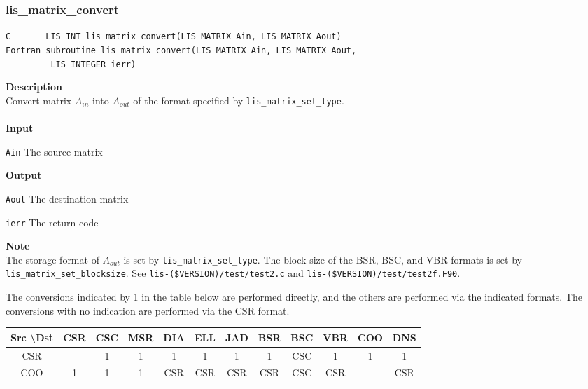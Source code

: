\documentclass[a4paper]{article}
\newcommand{\namelistlabel}[1]{\mbox{#1}\hfill}
\newenvironment{namelist}[1]{%
\begin{list}{}
  {\let\makelabel\namelistlabel
  \settowidth{\labelwidth}{#1}
  \setlength{\leftmargin}{1.1\labelwidth}}
  }{%
\end{list}}
\begin{document}
\newpage
\subsubsection{lis\_matrix\_convert}
\begin{screen}
\verb|C       LIS_INT lis_matrix_convert(LIS_MATRIX Ain, LIS_MATRIX Aout)|\\
\verb|Fortran subroutine lis_matrix_convert(LIS_MATRIX Ain, LIS_MATRIX Aout,|\\
\verb|         LIS_INTEGER ierr)|
\end{screen}
{\bf Description}\\
\indent
Convert matrix $A_{in}$ into $A_{out}$ of the format specified by {\tt lis\_matrix\_set\_type}.
\\ \\
\noindent
{\bf Input}
\begin{namelist}{XXXXXXXXXXXXXXXXXXXX}
\item[\tt Ain] The source matrix
\end{namelist}
{\bf Output}
\begin{namelist}{XXXXXXXXXXXXXXXXXXXX}
\item[\tt Aout] The destination matrix
\item[\tt ierr] The return code
\end{namelist}
{\bf Note}\\
\indent
The storage format of $A_{out}$ is set by \verb|lis_matrix_set_type|. 
The block size of the BSR, BSC, and VBR formats is set by \verb|lis_matrix_set_blocksize|. See {\tt lis-(\$VERSION)/test/test2.c} and
{\tt lis-(\$VERSION)/test/test2f.F90}.

The conversions indicated by 1 in the table below are performed directly, 
and the others are performed via the indicated formats. 
The conversions with no indication are performed via the CSR format.
\vspace*{5mm}

\begin{tabular}{|c|c|c|c|c|c|c|c|c|c|c|c|}
\hline
Src \textbackslash Dst & CSR & CSC & MSR & DIA & ELL & JAD & BSR & BSC & VBR & COO & DNS \\ \hline
CSR    &     &  1  &  1  &  1  &  1  &  1  &  1  &  CSC  &  1  &  1  &  1  \\ \hline
COO    &  1  &  1  &  1  & CSR  & CSR & CSR & CSR & CSC & CSR &     & CSR   \\ \hline
\end{tabular}

\newpage
\end{document}

